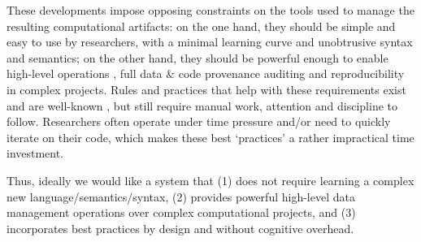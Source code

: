 \documentclass{article} %
\begin{document}
These developments impose opposing constraints on the tools used to manage the
resulting computational artifacts: on the one hand, they should be simple and
easy to use by researchers, with a minimal learning curve and unobtrusive syntax
and semantics; on the other hand, they should be powerful enough to enable
high-level operations \cite{wickham2014tidy}, full data \& code provenance
auditing \citep{davidson2008provenance} and reproducibility
\cite{ivie2018reproducibility} in complex projects.  Rules and practices that
help with these requirements exist and are well-known
\citep{sandve2013ten,wilkinson2016fair}, but still require manual work,
attention and discipline to follow. Researchers often operate under time
pressure and/or need to quickly iterate on their code, which makes these best
`practices' a rather impractical time investment. 

Thus, ideally we would like a system that (1) does not require learning a
complex new language/semantics/syntax, (2) provides powerful high-level data
management operations over complex computational projects, and (3) incorporates
best practices by design and without cognitive overhead.
\end{document}
